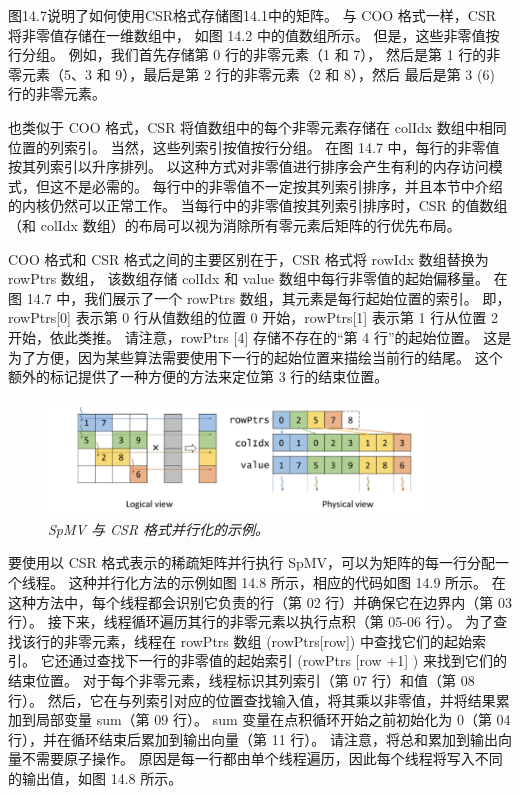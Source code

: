 图14.7说明了如何使用CSR格式存储图14.1中的矩阵。 与 COO 格式一样，CSR 将非零值存储在一维数组中，
如图 14.2 中的值数组所示。 但是，这些非零值按行分组。 例如，我们首先存储第 0 行的非零元素（1 和 7），
然后是第 1 行的非零元素（5、3 和 9），最后是第 2 行的非零元素（2 和 8），然后 最后是第 3 (6) 行的非零元素。

也类似于 $\mathrm{COO}$ 格式，CSR 将值数组中的每个非零元素存储在 colIdx 数组中相同位置的列索引。 
当然，这些列索引按值按行分组。 在图 14.7 中，每行的非零值按其列索引以升序排列。 
以这种方式对非零值进行排序会产生有利的内存访问模式，但这不是必需的。 
每行中的非零值不一定按其列索引排序，并且本节中介绍的内核仍然可以正常工作。 
当每行中的非零值按其列索引排序时，CSR 的值数组（和 colIdx 数组）的布局可以视为消除所有零元素后矩阵的行优先布局。

COO 格式和 CSR 格式之间的主要区别在于，CSR 格式将 rowIdx 数组替换为 rowPtrs 数组，
该数组存储 colIdx 和 value 数组中每行非零值的起始偏移量。 
在图 14.7 中，我们展示了一个 rowPtrs 数组，其元素是每行起始位置的索引。 
即，rowPtrs[0] 表示第 0 行从值数组的位置 0 开始，rowPtrs[1] 表示第 1 行从位置 2 开始，依此类推。 
请注意，rowPtrs [4] 存储不存在的“第 4 行”的起始位置。 
这是为了方便，因为某些算法需要使用下一行的起始位置来描绘当前行的结尾。 
这个额外的标记提供了一种方便的方法来定位第 3 行的结束位置。

\begin{figure}[H]
	\centering
	\includegraphics[width=0.9\textwidth]{figs/F14.8.png}
	\caption{\textit{SpMV 与 CSR 格式并行化的示例。}}
\end{figure}

要使用以 CSR 格式表示的稀疏矩阵并行执行 SpMV，可以为矩阵的每一行分配一个线程。 
这种并行化方法的示例如图 14.8 所示，相应的代码如图 14.9 所示。 
在这种方法中，每个线程都会识别它负责的行（第 02 行）并确保它在边界内（第 03 行）。 
接下来，线程循环遍历其行的非零元素以执行点积（第 05-06 行）。 
为了查找该行的非零元素，线程在 rowPtrs 数组 (rowPtrs[row]) 中查找它们的起始索引。 
它还通过查找下一行的非零值的起始索引 (rowPtrs [row +1] ) 来找到它们的结束位置。 
对于每个非零元素，线程标识其列索引（第 07 行）和值（第 08 行）。 
然后，它在与列索引对应的位置查找输入值，将其乘以非零值，并将结果累加到局部变量 sum（第 09 行）。 
sum 变量在点积循环开始之前初始化为 0（第 04 行），并在循环结束后累加到输出向量（第 11 行）。 
请注意，将总和累加到输出向量不需要原子操作。 
原因是每一行都由单个线程遍历，因此每个线程将写入不同的输出值，如图 14.8 所示。

